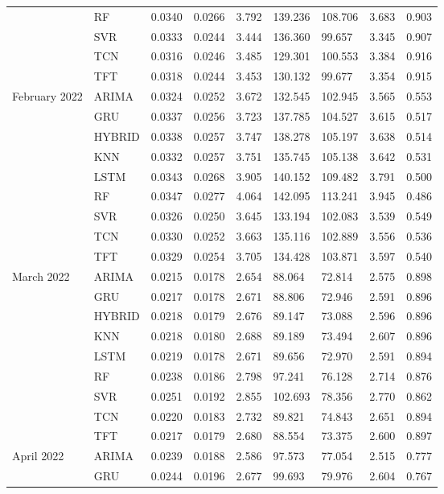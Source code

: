 \begin{tabular}{lllllllll}
 & RF & 0.0340 & 0.0266 & 3.792 & 139.236 & 108.706 & 3.683 & 0.903 \\
 & SVR & 0.0333 & 0.0244 & 3.444 & 136.360 & 99.657 & 3.345 & 0.907 \\
 & TCN & 0.0316 & 0.0246 & 3.485 & 129.301 & 100.553 & 3.384 & 0.916 \\
 & TFT & 0.0318 & 0.0244 & 3.453 & 130.132 & 99.677 & 3.354 & 0.915 \\
February 2022 & ARIMA & 0.0324 & 0.0252 & 3.672 & 132.545 & 102.945 & 3.565 & 0.553 \\
 & GRU & 0.0337 & 0.0256 & 3.723 & 137.785 & 104.527 & 3.615 & 0.517 \\
 & HYBRID & 0.0338 & 0.0257 & 3.747 & 138.278 & 105.197 & 3.638 & 0.514 \\
 & KNN & 0.0332 & 0.0257 & 3.751 & 135.745 & 105.138 & 3.642 & 0.531 \\
 & LSTM & 0.0343 & 0.0268 & 3.905 & 140.152 & 109.482 & 3.791 & 0.500 \\
 & RF & 0.0347 & 0.0277 & 4.064 & 142.095 & 113.241 & 3.945 & 0.486 \\
 & SVR & 0.0326 & 0.0250 & 3.645 & 133.194 & 102.083 & 3.539 & 0.549 \\
 & TCN & 0.0330 & 0.0252 & 3.663 & 135.116 & 102.889 & 3.556 & 0.536 \\
 & TFT & 0.0329 & 0.0254 & 3.705 & 134.428 & 103.871 & 3.597 & 0.540 \\
March 2022 & ARIMA & 0.0215 & 0.0178 & 2.654 & 88.064 & 72.814 & 2.575 & 0.898 \\
 & GRU & 0.0217 & 0.0178 & 2.671 & 88.806 & 72.946 & 2.591 & 0.896 \\
 & HYBRID & 0.0218 & 0.0179 & 2.676 & 89.147 & 73.088 & 2.596 & 0.896 \\
 & KNN & 0.0218 & 0.0180 & 2.688 & 89.189 & 73.494 & 2.607 & 0.896 \\
 & LSTM & 0.0219 & 0.0178 & 2.671 & 89.656 & 72.970 & 2.591 & 0.894 \\
 & RF & 0.0238 & 0.0186 & 2.798 & 97.241 & 76.128 & 2.714 & 0.876 \\
 & SVR & 0.0251 & 0.0192 & 2.855 & 102.693 & 78.356 & 2.770 & 0.862 \\
 & TCN & 0.0220 & 0.0183 & 2.732 & 89.821 & 74.843 & 2.651 & 0.894 \\
 & TFT & 0.0217 & 0.0179 & 2.680 & 88.554 & 73.375 & 2.600 & 0.897 \\
April 2022 & ARIMA & 0.0239 & 0.0188 & 2.586 & 97.573 & 77.054 & 2.515 & 0.777 \\
 & GRU & 0.0244 & 0.0196 & 2.677 & 99.693 & 79.976 & 2.604 & 0.767 \\

\end{tabular}
